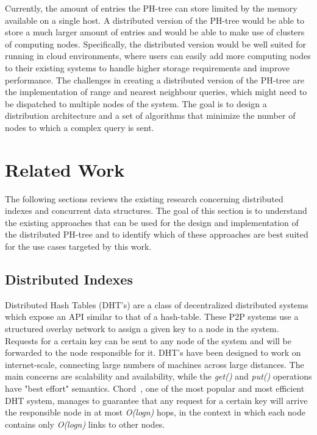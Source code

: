 \documentclass[11pt,a4paper]{globis-book}
\begin{document}
Currently, the amount of entries the PH-tree can store limited by the memory available on a single host. A distributed version of the PH-tree would be able to store a much larger amount of entries and would be able to make use of clusters of computing nodes. Specifically, the distributed version would be well suited for running in cloud environments, where users can easily add more computing nodes to their existing systems to handle higher storage requirements and improve performance. The challenges in creating a distributed version of the PH-tree are the implementation of range and nearest neighbour queries, which might need to be dispatched to multiple nodes of the system. The goal is to design a distribution architecture and a set of algorithms that minimize the number of nodes to which a complex query is sent.

\section{Related Work}
\label{sec:background-rw}

The following sections reviews the existing research concerning distributed indexes and concurrent data structures. The goal of this section is to understand the existing approaches that can be used for the design and implementation of the distributed PH-tree and to identify which of these approaches are best suited for the use cases targeted by this work.
\subsection{Distributed Indexes}

Distributed Hash Tables (DHT's) are a class of decentralized distributed systems which expose an API similar to that of a hash-table. These P2P systems use a structured overlay network to assign a given key to a node in the system. Requests for a certain key can be sent to any node of the system and will be forwarded to the node responsible for it. DHT's have been designed to work on internet-scale, connecting large numbers of machines across large distances. The main concerns are scalability and availability, while the \textit{get()} and \textit{put()} operations have "best effort" semantics. Chord~\cite{Stoica2001chord}, one of the most popular and most efficient DHT system, manages to guarantee that any request for a certain key will arrive the responsible node in at most \textit{O(logn)} hops, in the context in which each node contains only \textit{O(logn)} links to other nodes. 
\end{document}
